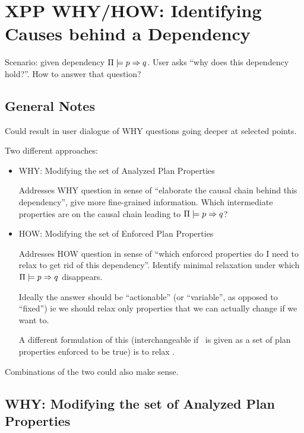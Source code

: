 \section{XPP WHY/HOW: Identifying Causes behind a Dependency}
\label{xpp-identify-causes}

Scenario: given dependency $\Pi \models p \Rightarrow q$. User
asks ``why does this dependency hold?''. How to answer that question?



\subsection{General Notes}

Could result in user dialogue of WHY questions going deeper at
selected points.

Two different approaches:
\begin{itemize}
\item WHY: Modifying the set of Analyzed Plan Properties

  Addresses WHY question in sense of ``elaborate the causal chain
  behind this dependency'', give more fine-grained information. Which
  intermediate properties are on the causal chain leading to
  $\Pi \models p \Rightarrow q$?

\item HOW: Modifying the set of Enforced Plan Properties

  Addresses HOW question in sense of ``which enforced properties do I
  need to relax to get rid of this dependency''. Identify minimal
  relaxation under which $\Pi \models p \Rightarrow q$ disappears.

  Ideally the answer should be ``actionable'' (or ``variable'', as
  opposed to ``fixed'') ie we should relax only properties that we can
  actually change if we want to.

  A different formulation of this (interchangeable if \plans\ is given
  as a set of plan properties enforced to be true) is to relax \prop.

\end{itemize}

Combinations of the two could also make sense.




\subsection{WHY: Modifying the set of Analyzed Plan Properties}
\label{xpp:identify-causes:analyzed}


